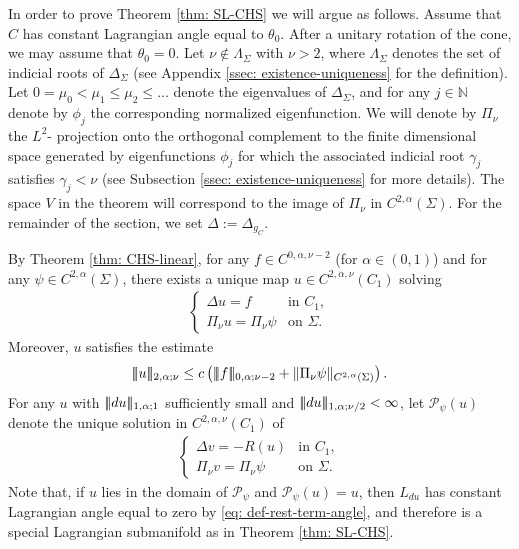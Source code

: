 \documentclass[11pt]{amsart}
\DeclarePairedDelimiter{\tnorm}{\vert\!\vert\!\vert}{\vert\!\vert\!\vert}
\theoremstyle{definition}
\theoremstyle{remark}
\begin{document}
In order to prove Theorem \ref{thm: SL-CHS} we will argue as follows. Assume that $C$ has constant Lagrangian angle equal to $\theta_0$. After a unitary rotation of the cone, we may assume that $\theta_0=0$.
Let $\nu\notin \Lambda_\Sigma$ with $\nu> 2$, where $\Lambda_\Sigma$ denotes the set of indicial roots of $\Delta_\Sigma$ (see Appendix \ref{ssec: existence-uniqueness} for the definition).
Let $0=\mu_0<\mu_1\leq \mu_2\leq...$ denote the eigenvalues of $\Delta_\Sigma$, and for any $j\in \mathbb{N}$ denote by $\phi_j$ the corresponding normalized eigenfunction.
We will denote by $\Pi_\nu$ the $L^2$- projection onto the orthogonal complement to the finite dimensional space generated by eigenfunctions $\phi_j$ for which the associated indicial root $\gamma_j$ satisfies $\gamma_j<\nu$ (see Subsection \ref{ssec: existence-uniqueness} for more details). The space $V$ in the theorem will correspond to the image of $\Pi_\nu$ in $C^{2,\alpha}(\Sigma)$. For the remainder of the section, we set $\Delta := \Delta_{g_C}$.

By Theorem \ref{thm: CHS-linear}, for any $f\in C^{0,\alpha, \nu-2}$ (for $\alpha \in (0,1)$) and for any $\psi\in C^{2,\alpha}(\Sigma)$, there exists a unique map $u\in C^{2,\alpha,\nu}(C_1)$ solving
\begin{align}\label{eq:dirichlet-u-section-4}
\begin{cases}
    \Delta u=f & \text{in } C_{1},\\
    \Pi_\nu u=\Pi_\nu\psi & \text{on } \Sigma.
\end{cases}
\end{align}
Moreover, $u$ satisfies the estimate
\begin{align}\label{eq: est-u-CHS}
    \tnorm{u}_{2,\alpha;\nu}
    \leq
    c\left(
       \tnorm{f}_{0,\alpha;\nu-2}
        +
        \|\Pi_\nu\psi\|_{C^{2,\alpha}(\Sigma)}
    \right).
\end{align}
For any \(u\) with
$\tnorm{du}_{1,\alpha;1}$
sufficiently small and $\tnorm{du}_{1,\alpha;\nu/2}<\infty$, let $\mathcal{P}_\psi(u)$ denote the unique solution in $C^{2,\alpha, \nu}(C_1)$ of
\begin{align*}\label{eq:dirichlet-u-section-4-for-v}
\begin{cases}
    \Delta v=-R(u) & \text{in } C_{1},\\
    \Pi_\nu v=\Pi_\nu\psi & \text{on } \Sigma.
\end{cases}
\end{align*}
Note that, if \(u\) lies in the domain of \(\mathcal P_\psi\) and $\mathcal{P}_\psi(u)=u$, then $L_{du}$ has constant Lagrangian angle equal to zero by \eqref{eq: def-rest-term-angle}, and therefore is a special Lagrangian submanifold as in Theorem \ref{thm: SL-CHS}. 
\end{document}
